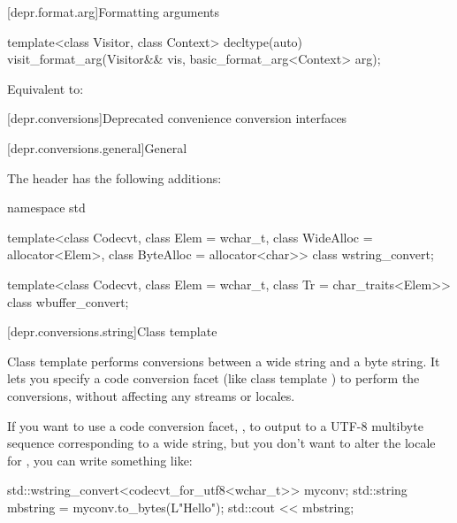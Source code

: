 [depr.format.arg]{Formatting arguments}

%
\begin{itemdecl}
template<class Visitor, class Context>
  decltype(auto) visit_format_arg(Visitor&& vis, basic_format_arg<Context> arg);
\end{itemdecl}

\begin{itemdescr}
\pnum
\effects
Equivalent to: 
\end{itemdescr}

[depr.conversions]{Deprecated convenience conversion interfaces}

[depr.conversions.general]{General}

\pnum
The header  has the following additions:

\begin{codeblock}
namespace std {
  template<class Codecvt, class Elem = wchar_t,
           class WideAlloc = allocator<Elem>,
           class ByteAlloc = allocator<char>>
    class wstring_convert;

  template<class Codecvt, class Elem = wchar_t,
           class Tr = char_traits<Elem>>
    class wbuffer_convert;
}
\end{codeblock}

[depr.conversions.string]{Class template }

\pnum
Class template  performs conversions between a wide
string and a byte string. It lets you specify a code conversion facet
(like class template ) to perform the conversions, without
affecting any streams or locales.
\begin{example}
If you want to use a code
conversion facet, , to output to  a UTF-8
multibyte sequence corresponding to a wide string, but you don't want to
alter the locale for , you can write something like:
\begin{codeblock}
std::wstring_convert<codecvt_for_utf8<wchar_t>> myconv;
std::string mbstring = myconv.to_bytes(L"Hello\n");
std::cout << mbstring;
\end{codeblock}
\end{example}

